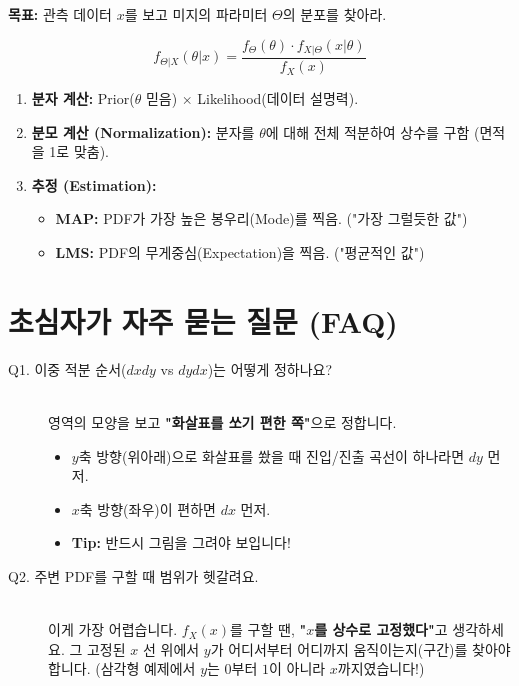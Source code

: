 \documentclass[11pt,a4paper]{book}
\theoremstyle{definition}
\begin{document}
\begin{mathstep}[title={베이지안 추론의 3단계}]
\textbf{목표:} 관측 데이터 $x$를 보고 미지의 파라미터 $\Theta$의 분포를 찾아라.

\[ f_{\Theta|X}(\theta|x) = \frac{f_\Theta(\theta) \cdot f_{X|\Theta}(x|\theta)}{f_X(x)} \]

\begin{enumerate}
    \item \textbf{분자 계산:} Prior($\theta$ 믿음) $\times$ Likelihood(데이터 설명력).
    \item \textbf{분모 계산 (Normalization):} 분자를 $\theta$에 대해 전체 적분하여 상수를 구함 (면적을 1로 맞춤).
    \item \textbf{추정 (Estimation):}
    \begin{itemize}
        \item \textbf{MAP:} PDF가 가장 높은 봉우리(Mode)를 찍음. ("가장 그럴듯한 값")
        \item \textbf{LMS:} PDF의 무게중심(Expectation)을 찍음. ("평균적인 값")
    \end{itemize}
\end{enumerate}
\end{mathstep}

\section{초심자가 자주 묻는 질문 (FAQ)}

\begin{description}
    \item[Q1. 이중 적분 순서($dx dy$ vs $dy dx$)는 어떻게 정하나요?] \hfill \\
    영역의 모양을 보고 \textbf{"화살표를 쏘기 편한 쪽"}으로 정합니다.
    \begin{itemize}
        \item $y$축 방향(위아래)으로 화살표를 쐈을 때 진입/진출 곡선이 하나라면 $dy$ 먼저.
        \item $x$축 방향(좌우)이 편하면 $dx$ 먼저.
        \item \textbf{Tip:} 반드시 그림을 그려야 보입니다!
    \end{itemize}
    
    \item[Q2. 주변 PDF를 구할 때 범위가 헷갈려요.] \hfill \\
    이게 가장 어렵습니다. $f_X(x)$를 구할 땐, \textbf{"$x$를 상수로 고정했다"}고 생각하세요. 그 고정된 $x$ 선 위에서 $y$가 어디서부터 어디까지 움직이는지(구간)를 찾아야 합니다. (삼각형 예제에서 $y$는 $0$부터 $1$이 아니라 $x$까지였습니다!)
\end{description}
\end{document}
